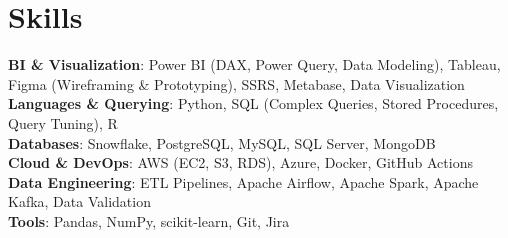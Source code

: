 \documentclass[Sans-serif,10.5 pt]{article}
\begin{document}
\section{Skills}
  \begin{itemize}[leftmargin=0.15in, label={}]\vspace{0mm}
    \small{\item{
      \textbf{BI \& Visualization}{: Power BI (DAX, Power Query, Data Modeling), Tableau, Figma (Wireframing \& Prototyping), SSRS, Metabase, Data Visualization} \\
      \textbf{Languages \& Querying}{: Python, SQL (Complex Queries, Stored Procedures, Query Tuning), R} \\
      \textbf{Databases}{: Snowflake, PostgreSQL, MySQL, SQL Server, MongoDB} \\
      \textbf{Cloud \& DevOps}{: AWS (EC2, S3, RDS), Azure, Docker, GitHub Actions} \\
      \textbf{Data Engineering}{: ETL Pipelines, Apache Airflow, Apache Spark, Apache Kafka, Data Validation} \\
      \textbf{Tools}{: Pandas, NumPy, scikit-learn, Git, Jira} \\
    }}
  \end{itemize}\vspace{-3mm}
\end{document}
